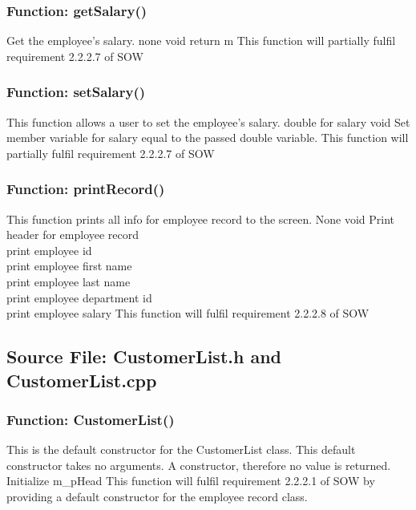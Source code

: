 \documentclass[12pt]{article}%
\newcounter{subsubsubsection}[subsubsection]
\begin{document}
\subsubsection{Function:  getSalary()}
Get the employee's salary.
none
void
return m\dSalary
{}
This function will partially fulfil requirement 2.2.2.7 of SOW

\subsubsection{Function:  setSalary()}
This function allows a user to set the employee's salary.
double for salary
void
Set member variable for salary equal to the passed double variable.
This function will partially fulfil requirement 2.2.2.7 of SOW

\subsubsection{Function:  printRecord()}
This function prints all info for employee record to the screen.
None
void
Print header for employee record\\
print employee id\\
print employee first name\\
print employee last name\\
print employee department id\\
print employee salary
This function will fulfil requirement 2.2.2.8 of SOW

\subsection{Source File: CustomerList.h and CustomerList.cpp}
\subsubsection{Function: CustomerList()}
This is the default constructor for the CustomerList class.
This default constructor takes no arguments.
A constructor, therefore no value is returned.
Initialize m\_pHead
This function will fulfil requirement 2.2.2.1 of SOW by providing a default constructor for the
employee record class.
\end{document}
